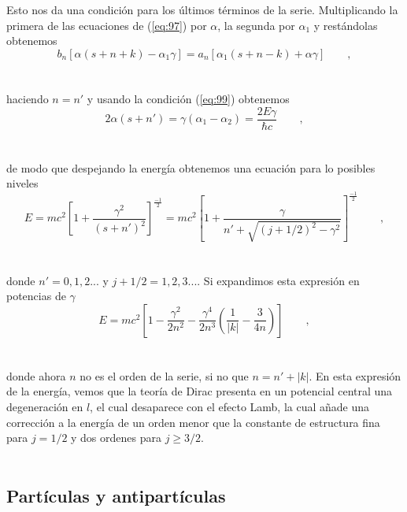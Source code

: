 \documentclass[11pt,letterpaper]{article}     %
\begin{document}
Esto nos da una condición para los últimos términos de la serie. Multiplicando la primera de las ecuaciones de (\ref{eq:97}) por $\alpha$, la segunda por $\alpha_1$ y  restándolas obtenemos
\begin{equation} \label{eq:101}
b_n[\alpha(s+n+k)-\alpha_1 \gamma]=a_n[\alpha_1(s+n-k)+ \alpha \gamma] \qquad ,
\end{equation} \\ \\
haciendo $n=n'$ y usando la condición (\ref{eq:99}) obtenemos
\begin{equation} \label{eq:102}
2 \alpha (s+n')= \gamma (\alpha_1 - \alpha_2)=\frac{2 E \gamma}{\hbar c} \qquad ,
\end{equation} \\ \\
de modo que despejando la energía obtenemos una ecuación para lo posibles niveles
\begin{equation}\label{eq:103}
E=mc^2 \left[1 + \frac{\gamma^2}{(s+n')^2} \right]^{\frac{-1}{2}}  = mc^2 \left[1 + \frac{\gamma}{n' + \sqrt{(j+ 1/2)^2 - \gamma^2}}\right]^\frac{-1}{2} \qquad ,
\end{equation} \\ \\
donde $n'=0,1,2...$ y $j+1/2=1,2,3...  $. Si expandimos esta expresión en potencias de $\gamma$
\begin{equation}\label{eq:104}
E=mc^2 \left[ 1- \frac{\gamma^2}{2n^2} - \frac{\gamma^4}{2n^3} \left(\frac{1}{|k|} - \frac{3}{4n}\right)\right] \qquad ,
\end{equation} \\ \\
donde ahora $n$ no es el orden de la serie, si no que $n=n'+|k|$. En esta expresión de la energía, vemos que la teoría de Dirac presenta en un potencial central una degeneración en $l$, el cual desaparece con el efecto Lamb, la cual añade una corrección a la energía de un orden menor que la constante de estructura fina para $j=1/2$ y dos ordenes para $j\geq 3/2$. \\ \\







\subsection{Partículas y antipartículas}
\end{document}
